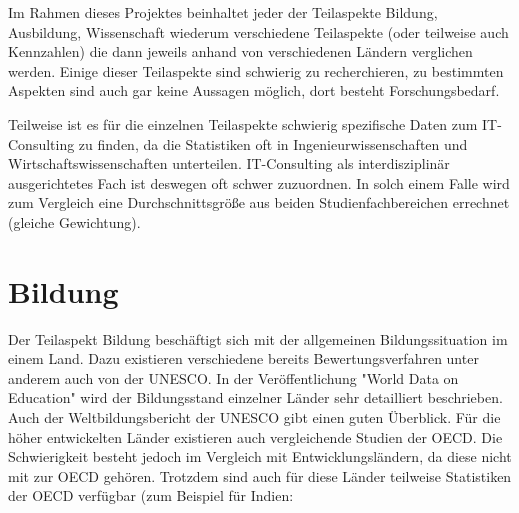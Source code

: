 Im Rahmen dieses Projektes beinhaltet jeder der Teilaspekte Bildung, Ausbildung, Wissenschaft wiederum verschiedene Teilaspekte (oder teilweise auch Kennzahlen) die dann jeweils anhand von verschiedenen Ländern verglichen werden. Einige dieser Teilaspekte sind schwierig zu recherchieren, zu bestimmten Aspekten sind auch gar keine Aussagen möglich, dort besteht Forschungsbedarf. 

Teilweise ist es für die einzelnen Teilaspekte schwierig spezifische Daten zum IT-Consulting zu finden, da die Statistiken oft in Ingenieurwissenschaften und Wirtschaftswissenschaften unterteilen. IT-Consulting als interdisziplinär ausgerichtetes Fach ist deswegen oft schwer zuzuordnen. In solch einem Falle wird zum Vergleich eine Durchschnittsgröße aus beiden Studienfachbereichen errechnet (gleiche Gewichtung).

\section{Bildung}
Der Teilaspekt Bildung beschäftigt sich mit der allgemeinen Bildungssituation im einem Land. Dazu existieren verschiedene bereits Bewertungsverfahren unter anderem auch von der UNESCO. In der Veröffentlichung "World Data on Education" \cite{unesco2} wird der Bildungsstand einzelner Länder sehr detailliert beschrieben. Auch der Weltbildungsbericht der UNESCO \cite{unesco1} gibt einen guten Überblick. 
Für die höher entwickelten Länder existieren auch vergleichende Studien der OECD. Die Schwierigkeit besteht jedoch im Vergleich mit Entwicklungsländern, da diese nicht mit zur OECD gehören. Trotzdem sind auch für diese Länder teilweise Statistiken der OECD verfügbar (zum Beispiel für Indien: \cite{oecd}

